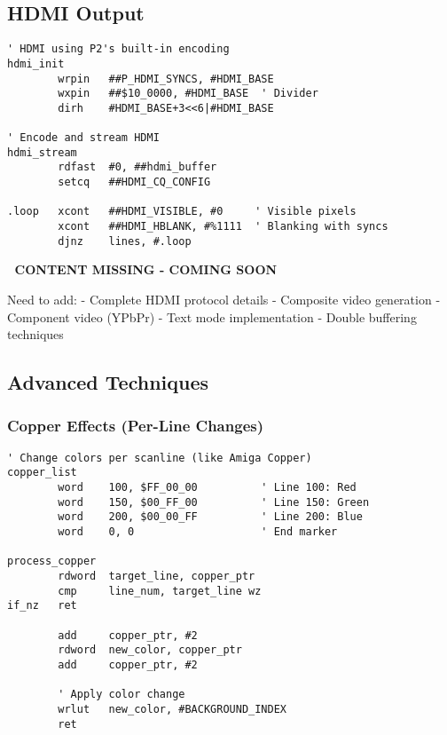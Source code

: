 \documentclass[11pt]{book}
\begin{document}
\hypertarget{hdmi-output}{%
\subsection{HDMI Output}\label{hdmi-output}}

\begin{lstlisting}
' HDMI using P2's built-in encoding
hdmi_init
        wrpin   ##P_HDMI_SYNCS, #HDMI_BASE
        wxpin   ##$10_0000, #HDMI_BASE  ' Divider
        dirh    #HDMI_BASE+3<<6|#HDMI_BASE
        
' Encode and stream HDMI
hdmi_stream
        rdfast  #0, ##hdmi_buffer
        setcq   ##HDMI_CQ_CONFIG
        
.loop   xcont   ##HDMI_VISIBLE, #0     ' Visible pixels
        xcont   ##HDMI_HBLANK, #%1111  ' Blanking with syncs
        djnz    lines, #.loop
\end{lstlisting}

\begin{missing}
🚧 \textbf{CONTENT MISSING - COMING SOON}

Need to add:
- Complete HDMI protocol details
- Composite video generation
- Component video (YPbPr)
- Text mode implementation
- Double buffering techniques
\end{missing}

\hypertarget{advanced-techniques}{%
\subsection{Advanced Techniques}\label{advanced-techniques}}

\hypertarget{copper-effects-per-line-changes}{%
\subsubsection{Copper Effects (Per-Line
Changes)}\label{copper-effects-per-line-changes}}

\begin{lstlisting}
' Change colors per scanline (like Amiga Copper)
copper_list
        word    100, $FF_00_00          ' Line 100: Red
        word    150, $00_FF_00          ' Line 150: Green
        word    200, $00_00_FF          ' Line 200: Blue
        word    0, 0                    ' End marker

process_copper
        rdword  target_line, copper_ptr
        cmp     line_num, target_line wz
if_nz   ret
        
        add     copper_ptr, #2
        rdword  new_color, copper_ptr
        add     copper_ptr, #2
        
        ' Apply color change
        wrlut   new_color, #BACKGROUND_INDEX
        ret
\end{lstlisting}
\end{document}
